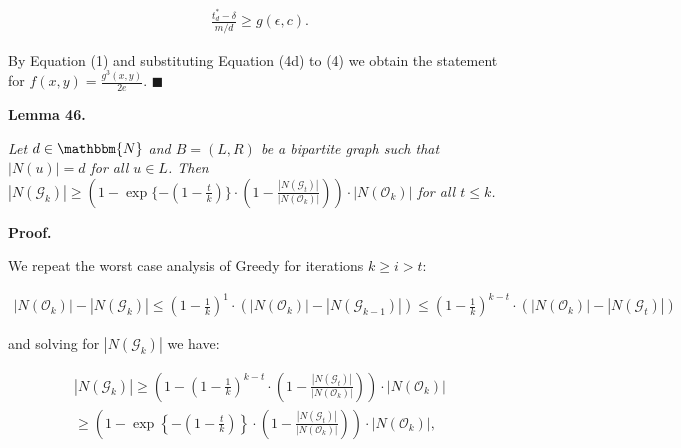 \[\begin{gathered}
\displaystyle\frac{t^{*}_{d}-\delta}{m/d}\geq g(\epsilon,c).
\end{gathered}\]


By Equation (1) and substituting Equation (4d) to (4) we obtain the statement for $f(x,y)=\frac{g^{3}(x,y)}{2e}$.
\ensuremath{\blacksquare}\par






\par\medskip\noindent\textbf{\textbf{Lemma 46}\textbf{.}}\par



\emph{Let $d\in\mathbbm{N}$ and $B=(L,R)$ be a bipartite graph such that $|N(u)|=d$ for all $u\in L$.
Then $|N(\mathcal{G}_{k})|\geq\left(1-\exp\{-(1-\frac{t}{k})\}\cdot\left(1-\frac{|N(\mathcal{G}_{t})|}{|N(\mathcal{O}_{k})|}\right)\right)\cdot|N(\mathcal{O}_{k})|$ for all $t\leq k$.}\par






\par\medskip\noindent\textbf{Proof.}\par



We repeat the worst case analysis of Greedy for iterations $k\geq i>t$:\par


\[\begin{gathered}
\displaystyle|N(\mathcal{O}_{k})|-|N(\mathcal{G}_{k})|\leq\left(1-\frac{1}{k}\right)^{1}\cdot\left(|N(\mathcal{O}_{k})|-|N(\mathcal{G}_{k-1})|\right)\leq\left(1-\frac{1}{k}\right)^{k-t}\cdot\left(|N(\mathcal{O}_{k})|-|N(\mathcal{G}_{t})|\right)
\end{gathered}\]


and solving for $|N(\mathcal{G}_{k})|$ we have:\par


\[\begin{gathered}
\displaystyle|N(\mathcal{G}_{k})| \displaystyle\geq\left(1-\left(1-\frac{1}{k}\right)^{k-t}\cdot\left(1-\frac{|N(\mathcal{G}_{t})|}{|N(\mathcal{O}_{k})|}\right)\right)\cdot|N(\mathcal{O}_{k})| \\
\displaystyle\geq\left(1-\exp\left\{-\left(1-\frac{t}{k}\right)\right\}\cdot\left(1-\frac{|N(\mathcal{G}_{t})|}{|N(\mathcal{O}_{k})|}\right)\right)\cdot|N(\mathcal{O}_{k})|,
\end{gathered}\]


